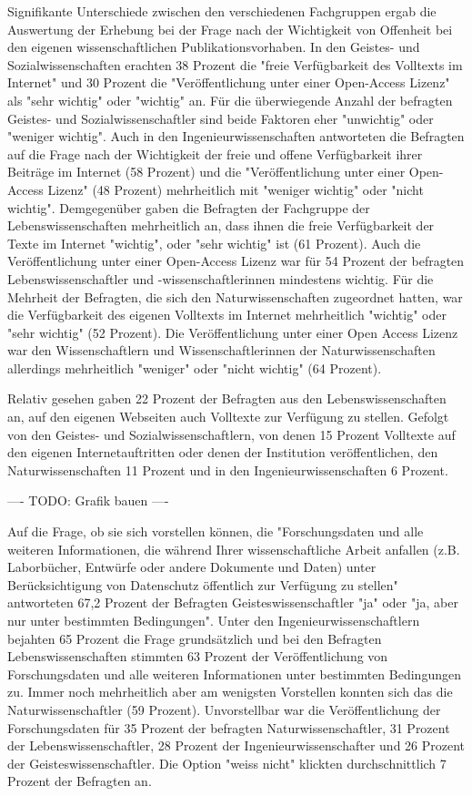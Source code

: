 Signifikante Unterschiede zwischen den verschiedenen Fachgruppen ergab die Auswertung der Erhebung bei der Frage nach der Wichtigkeit von Offenheit bei den eigenen wissenschaftlichen Publikationsvorhaben. In den Geistes- und Sozialwissenschaften erachten 38 Prozent die "freie Verfügbarkeit des Volltexts im Internet" und 30 Prozent die "Veröffentlichung unter einer Open-Access Lizenz" als "sehr wichtig" oder "wichtig" an. Für die überwiegende Anzahl der befragten Geistes- und Sozialwissenschaftler sind beide Faktoren eher "unwichtig" oder "weniger wichtig". Auch in den Ingenieurwissenschaften antworteten die Befragten auf die Frage nach der Wichtigkeit der freie und offene Verfügbarkeit ihrer Beiträge im Internet (58 Prozent) und die "Veröffentlichung unter einer Open-Access Lizenz" (48 Prozent) mehrheitlich mit "weniger wichtig" oder "nicht wichtig". Demgegenüber gaben die Befragten der Fachgruppe der Lebenswissenschaften mehrheitlich an, dass ihnen die freie Verfügbarkeit der Texte im Internet "wichtig", oder "sehr wichtig" ist (61 Prozent). Auch die Veröffentlichung unter einer Open-Access Lizenz war für 54 Prozent der befragten Lebenswissenschaftler und -wissenschaftlerinnen mindestens wichtig. Für die Mehrheit der Befragten, die sich den Naturwissenschaften zugeordnet hatten, war die Verfügbarkeit des eigenen Volltexts im Internet mehrheitlich "wichtig" oder "sehr wichtig" (52 Prozent). Die Veröffentlichung unter einer Open Access Lizenz war den Wissenschaftlern und Wissenschaftlerinnen der Naturwissenschaften allerdings mehrheitlich "weniger" oder "nicht wichtig" (64 Prozent).

Relativ gesehen gaben 22 Prozent der Befragten aus den Lebenswissenschaften an, auf den eigenen Webseiten auch Volltexte zur Verfügung zu stellen. Gefolgt von den Geistes- und Sozialwissenschaftlern, von denen 15 Prozent Volltexte auf den eigenen Internetauftritten oder denen der Institution veröffentlichen, den Naturwissenschaften 11 Prozent und in den Ingenieurwissenschaften 6 Prozent.

---- TODO: Grafik bauen ----

Auf die Frage, ob sie sich vorstellen können, die "Forschungsdaten und alle weiteren Informationen, die während Ihrer wissenschaftliche Arbeit anfallen (z.B. Laborbücher, Entwürfe oder andere Dokumente und Daten) unter Berücksichtigung von Datenschutz öffentlich zur Verfügung zu stellen" antworteten 67,2 Prozent der Befragten Geisteswissenschaftler "ja" oder "ja, aber nur unter bestimmten Bedingungen". Unter den Ingenieurwissenschaftlern bejahten 65 Prozent die Frage grundsätzlich und bei den Befragten Lebenswissenschaften stimmten 63 Prozent der Veröffentlichung von Forschungsdaten und alle weiteren Informationen unter bestimmten Bedingungen zu. Immer noch mehrheitlich aber am wenigsten Vorstellen konnten sich das die Naturwissenschaftler (59 Prozent). Unvorstellbar war die Veröffentlichung der Forschungsdaten für 35 Prozent der befragten Naturwissenschaftler, 31 Prozent der Lebenswissenschaftler, 28 Prozent der Ingenieurwissenschafter und 26 Prozent der Geisteswissenschaftler. Die Option "weiss nicht" klickten durchschnittlich 7 Prozent der Befragten an.

